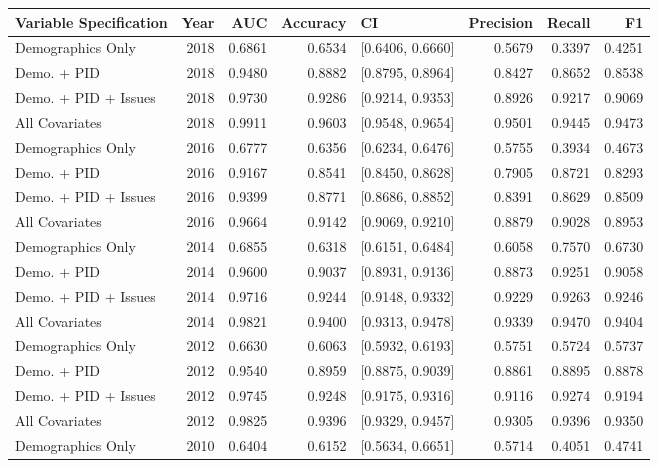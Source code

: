 \begin{table}[ht]
\centering
\begin{tabular}{lrrrlrrr}
  \toprule
Variable Specification & Year & AUC & Accuracy & CI & Precision & Recall & F1 \\ 
  \midrule
Demographics Only & 2018 & 0.6861 & 0.6534 & [0.6406, 0.6660] & 0.5679 & 0.3397 & 0.4251 \\ 
  Demo. + PID & 2018 & 0.9480 & 0.8882 & [0.8795, 0.8964] & 0.8427 & 0.8652 & 0.8538 \\ 
  Demo. + PID + Issues & 2018 & 0.9730 & 0.9286 & [0.9214, 0.9353] & 0.8926 & 0.9217 & 0.9069 \\ 
  All Covariates & 2018 & 0.9911 & 0.9603 & [0.9548, 0.9654] & 0.9501 & 0.9445 & 0.9473 \\ 
  Demographics Only & 2016 & 0.6777 & 0.6356 & [0.6234, 0.6476] & 0.5755 & 0.3934 & 0.4673 \\ 
  Demo. + PID & 2016 & 0.9167 & 0.8541 & [0.8450, 0.8628] & 0.7905 & 0.8721 & 0.8293 \\ 
  Demo. + PID + Issues & 2016 & 0.9399 & 0.8771 & [0.8686, 0.8852] & 0.8391 & 0.8629 & 0.8509 \\ 
  All Covariates & 2016 & 0.9664 & 0.9142 & [0.9069, 0.9210] & 0.8879 & 0.9028 & 0.8953 \\ 
  Demographics Only & 2014 & 0.6855 & 0.6318 & [0.6151, 0.6484] & 0.6058 & 0.7570 & 0.6730 \\ 
  Demo. + PID & 2014 & 0.9600 & 0.9037 & [0.8931, 0.9136] & 0.8873 & 0.9251 & 0.9058 \\ 
  Demo. + PID + Issues & 2014 & 0.9716 & 0.9244 & [0.9148, 0.9332] & 0.9229 & 0.9263 & 0.9246 \\ 
  All Covariates & 2014 & 0.9821 & 0.9400 & [0.9313, 0.9478] & 0.9339 & 0.9470 & 0.9404 \\ 
  Demographics Only & 2012 & 0.6630 & 0.6063 & [0.5932, 0.6193] & 0.5751 & 0.5724 & 0.5737 \\ 
  Demo. + PID & 2012 & 0.9540 & 0.8959 & [0.8875, 0.9039] & 0.8861 & 0.8895 & 0.8878 \\ 
  Demo. + PID + Issues & 2012 & 0.9745 & 0.9248 & [0.9175, 0.9316] & 0.9116 & 0.9274 & 0.9194 \\ 
  All Covariates & 2012 & 0.9825 & 0.9396 & [0.9329, 0.9457] & 0.9305 & 0.9396 & 0.9350 \\ 
  Demographics Only & 2010 & 0.6404 & 0.6152 & [0.5634, 0.6651] & 0.5714 & 0.4051 & 0.4741 \\ 

\end{tabular}
\end{table}
